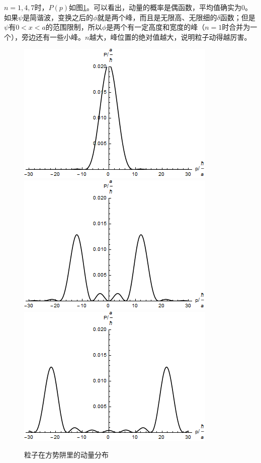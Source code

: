 $n=1,4,7$时，$P(p)$如图\ref{fig-square-well-p}。可以看出，动量的概率是偶函数，平均值确实为$0$。如果$\psi$是简谐波，变换之后的$\phi$就是两个峰，而且是无限高、无限细的$\delta$函数；但是$\psi$有$0<x<a$的范围限制，所以$\phi$是两个有一定高度和宽度的峰（$n=1$时合并为一个），旁边还有一些小峰。$n$越大，峰位置的绝对值越大，说明粒子动得越厉害。
\begin{figure}[htb]
\centering
\includegraphics[scale=0.4]{fig/square-well-p.png}
\includegraphics[scale=0.4]{fig/square-well-p-4.png}
\includegraphics[scale=0.4]{fig/square-well-p-7.png}
\caption{粒子在方势阱里的动量分布}
\label{fig-square-well-p}
\end{figure}

